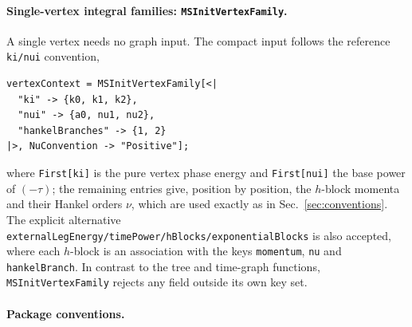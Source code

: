 \documentclass[11pt,a4paper]{article}
\numberwithin{table}{section}
\begin{document}
\paragraph{Single-vertex integral families: \texttt{MSInitVertexFamily}.}

A single vertex needs no graph input. The compact input follows the reference
\texttt{ki/nui} convention,
\begin{verbatim}
vertexContext = MSInitVertexFamily[<|
  "ki" -> {k0, k1, k2},
  "nui" -> {a0, nu1, nu2},
  "hankelBranches" -> {1, 2}
|>, NuConvention -> "Positive"];
\end{verbatim}
where \texttt{First[ki]} is the pure vertex phase energy and \texttt{First[nui]} the base power of
$(-\tau)$; the remaining entries give, position by position, the $h$-block momenta and their Hankel
orders $\nu$, which are used exactly as in Sec.~\ref{sec:conventions}. The explicit alternative
\texttt{externalLegEnergy/timePower/hBlocks/exponentialBlocks} is also accepted, where each
$h$-block is an association with the keys \texttt{momentum}, \texttt{nu} and
\texttt{hankelBranch}. In contrast to the tree and time-graph functions, \texttt{MSInitVertexFamily} rejects any
field outside its own key set.

\paragraph{Package conventions.}
\label{sec:package}
\end{document}
